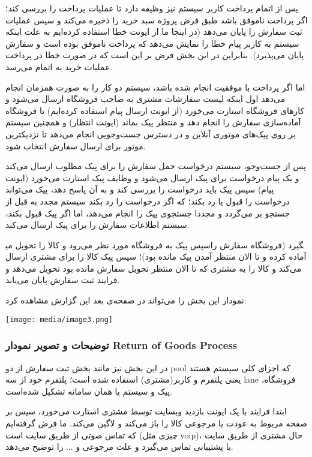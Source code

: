 \documentclass[]{article}
\begin{document}
پس از اتمام پرداخت کاربر سیستم نیز وظیفه دارد تا عملیات پرداخت را بررسی
کند؛ اگر پرداخت ناموفق باشد طبق فرض پروژه سبد خرید را ذخیره می‌کند و سپس
عملیات ثبت سفارش را پایان می‌دهد (در اینجا ما از ایونت خطا استفاده
کرده‌ایم به علت اینکه سیستم به کاربر پیام خطا را نمایش می‌دهد که پرداخت
ناموفق بوده است و سفارش پایان می‌پذیرد). بنابراین در این بخش فرض بر این
است که در صورت خطا در پرداخت عملیات خرید به اتمام می‌رسد.

اما اگر پرداخت با موفقیت انجام شده باشد، سیستم دو کار را به صورت همزمان
انجام می‌دهد اول اینکه لیست سفارشات مشتری به صاحب فروشگاه ارسال می‌شود و
کارهای فروشگاه استارت می‌خورد (از ایونت ارسال پیام استفاده کرده‌ایم) تا
فروشگاه آماده‌سازی سفارش را انجام دهد و منتظر پیک بماند (ایونت انتظار) و
همچنین سیستم بر روی پیک‌های موتوری آنلاین و در دسترس جست‌وجویی انجام
می‌دهد تا نزدیکترین موتور برای ارسال سفارش انتخاب شود.

پس از جست‌وجو، سیستم درخواست حمل سفارش را برای پیک مطلوب ارسال می‌کند و
یک پیام درخواست برای پیک ارسال می‌شود و وظایف پیک استارت می‌خورد (ایونت
پیام) سپس پیک باید درخواست را بررسی کند و به آن پاسخ دهد، پیک می‌تواند
درخواست را قبول یا رد بکند؛ که اگر درخواست را رد بکند سیستم مجدد به قبل
از جستجو بر می‌گردد و مجددا جستجوی پیک را انجام می‌دهد، اما اگر پیک قبول
بکند، سیستم اطلاعات سفارش را برای پیک ارسال می‌کند.

سپس پیک به فروشگاه مورد نظر می‌رود و کالا را تحویل می‎گیرد (فروشگاه
سفارش را آماده کرده و تا الان منتظر آمدن پیک مانده بود)؛ سپس پیک کالا را
برای مشتری ارسال می‌کند و کالا را به مشتری که تا الان منتظر تحویل سفارش
مانده بود تحویل می‌دهد و فرایند ثبت سفارش پایان می‌یابد.

نمودار این بخش را می‌تواند در صفحه‌ی بعد این گزارش مشاهده کرد:

\texttt{[image: media/image3.png]}

\subsubsection{توضیحات و تصویر نمودار Return of Goods
Process}\label{ux62aux648ux636ux6ccux62dux627ux62a-ux648-ux62aux635ux648ux6ccux631-ux646ux645ux648ux62fux627ux631-return-of-goods-process}

در این بخش نیز مانند بخش ثبت سفارش از دو pool که اجزای کلی سیستم هستند
یعنی پلتفرم و کاربر(مشتری) استفاده شده است؛ پلتفرم خود از سه lane
فروشگاه، پیک و سیستم یا همان سامانه تشکیل شده‌است.

ابتدا فرایند با یک ایونت بازدید وبسایت توسط مشتری استارت می‌خورد، سپس بر
صفحه مربوط به عودت یا مرجوعی کالا را باز می‌کند و لاگین می‌کند. ما فرض
گرفته‌ایم که تماس صوتی از طریق سایت است (چیزی مثل voip)، حال مشتری از
طریق سایت با پشتیبانی تماس می‌گیرد و علت مرجوعی و ... را توضیح می‌دهد.
\end{document}
